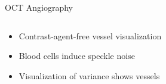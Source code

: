 \begin{frame}{OCT Angiography}
    \vspace{-0.5cm}
    \begin{columns}[c, onlytextwidth]
        \begin{column}{0.5\textwidth}
            \begin{itemize}
                \item Contrast-agent-free vessel visualization
                \item Blood cells induce speckle noise
                \item Visualization of variance shows vessels
            \end{itemize}
        \end{column}\begin{column}{0.5\textwidth}
            \begin{figure}[tbp]
                \centering
                \newlength{\picwidth}
                \newlength{\picheight} %
                \newlength{\mmwidth}
                \newlength{\mmheight}

                \setlength{\picwidth}{0.95\textwidth}
                \setlength{\picheight}{.866\picwidth} %
                \setlength{\mmwidth}{0.0833\picwidth} %
                \setlength{\mmheight}{0.513\picheight} %


\end{figure}
\end{column}
\end{columns}
\end{frame}
